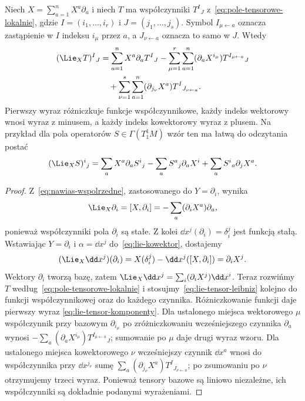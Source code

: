 \begin{twierdzenie}
\label{thm:lie-tensor-wspolrzedne}
Niech $X=\sum_{a=1}^nX^a\partial_a$ i niech $T$ ma
współczynniki $T^I{}_J$ z~\eqref{eq:pole-tensorowe-lokalnie},
gdzie $I=(i_1,\ldots,i_r)$ i $J=(j_1,\ldots,j_s)$.
Symbol $I_{\mu\leftarrow a}$ oznacza zastąpienie w $I$
indeksu $i_\mu$ przez $a$, a $J_{\nu\leftarrow a}$
oznacza to samo w $J$. Wtedy
\begin{equation}\label{eq:lie-tensor-komponenty}
\begin{aligned}
 (\Lie_XT)^I{}_J
 &=\sum_{a=1}^nX^a\partial_a T^I{}_J
 -\sum_{\mu=1}^r\sum_{a=1}^n
   (\partial_aX^{i_\mu})T^{I_{\mu\leftarrow a}}{}_J\\
 &\quad+\sum_{\nu=1}^s\sum_{a=1}^n
   (\partial_{j_\nu}X^a)T^I{}_{J_{\nu\leftarrow a}}.
\end{aligned}
\end{equation}
Pierwszy wyraz różniczkuje funkcje współczynnikowe,
każdy indeks wektorowy wnosi wyraz z minusem,
a każdy indeks kowektorowy wyraz z plusem.
Na przykład dla pola operatorów $S\in\Gamma(T^1_1M)$
wzór ten ma łatwą do odczytania postać
\[
 (\Lie_XS)^i{}_j
 =\sum_a X^a\partial_aS^i{}_j
  -\sum_a S^a{}_j\partial_aX^i
  +\sum_a S^i{}_a\partial_jX^a.
\]
\end{twierdzenie}
\begin{proof}
Z~\eqref{eq:nawias-wspolrzedne}, zastosowanego do
$Y=\partial_i$, wynika
\[
 \Lie_X\partial_i=[X,\partial_i]
 =-\sum_a(\partial_iX^a)\partial_a,
\]
ponieważ współczynniki pola $\partial_i$ są stałe.
Z kolei $\dd x^j(\partial_i)=\delta_i^j$ jest funkcją
stałą. Wstawiając $Y=\partial_i$ i $\alpha=\dd x^j$
do~\eqref{eq:lie-kowektor}, dostajemy
\[
 (\Lie_X\dd x^j)(\partial_i)
 =X(\delta_i^j)-\dd x^j([X,\partial_i])
 =\partial_iX^j.
\]
Wektory $\partial_i$ tworzą bazę, zatem
$\Lie_X\dd x^j=\sum_i(\partial_iX^j)\dd x^i$.
Teraz rozwińmy $T$ według~\eqref{eq:pole-tensorowe-lokalnie}
i stosujmy~\eqref{eq:lie-tensor-leibniz} kolejno
do funkcji współczynnikowej oraz do każdego czynnika.
Różniczkowanie funkcji daje pierwszy wyraz
\eqref{eq:lie-tensor-komponenty}. Dla ustalonego miejsca
wektorowego $\mu$ współczynnik przy bazowym
$\partial_{i_\mu}$ po zróżniczkowaniu wcześniejszego
czynnika $\partial_a$ wynosi
$-\sum_a(\partial_aX^{i_\mu})T^{I_{\mu\leftarrow a}}{}_J$;
sumowanie po $\mu$ daje drugi wyraz wzoru.
Dla ustalonego miejsca kowektorowego $\nu$ wcześniejszy
czynnik $\dd x^a$ wnosi do współczynnika przy
$\dd x^{j_\nu}$ sumę
$\sum_a(\partial_{j_\nu}X^a)T^I{}_{J_{\nu\leftarrow a}}$;
po zsumowaniu po $\nu$ otrzymujemy trzeci wyraz.
Ponieważ tensory bazowe są liniowo niezależne,
ich współczynniki są dokładnie podanymi wyrażeniami.
\end{proof}

